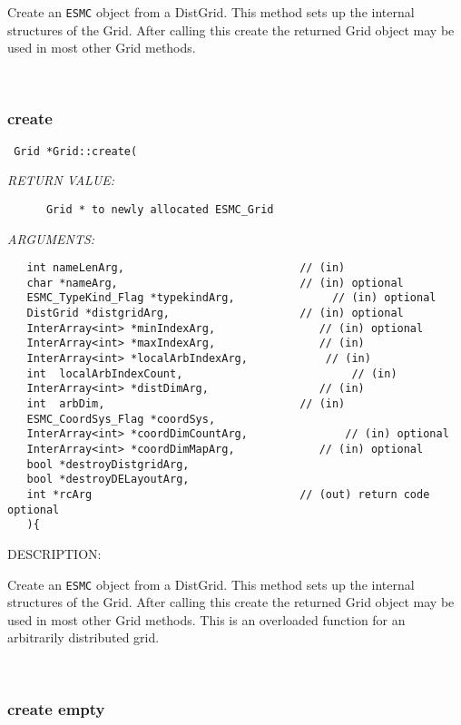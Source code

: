       Create an {\tt ESMC\gridArg} object from a DistGrid. This method sets up
    the internal structures of the Grid. After calling this create the 
    returned Grid object may be used in most other Grid methods.  
 
\mbox{}\hrulefill\ 
 
\subsubsection [create] {create}


  
\begin{verbatim} Grid *Grid::create(\end{verbatim}{\em RETURN VALUE:}
\begin{verbatim}      Grid * to newly allocated ESMC_Grid \end{verbatim}{\em ARGUMENTS:}
\begin{verbatim}   int nameLenArg,                           // (in) 
   char *nameArg,                            // (in) optional
   ESMC_TypeKind_Flag *typekindArg,               // (in) optional
   DistGrid *distgridArg,                    // (in) optional
   InterArray<int> *minIndexArg,                // (in) optional
   InterArray<int> *maxIndexArg,                // (in)
   InterArray<int> *localArbIndexArg,            // (in)
   int  localArbIndexCount,                          // (in)
   InterArray<int> *distDimArg,                 // (in) 
   int  arbDim,                              // (in)
   ESMC_CoordSys_Flag *coordSys, 
   InterArray<int> *coordDimCountArg,               // (in) optional
   InterArray<int> *coordDimMapArg,             // (in) optional
   bool *destroyDistgridArg,
   bool *destroyDELayoutArg,
   int *rcArg                                // (out) return code optional
   ){\end{verbatim}
{\sf DESCRIPTION:\\ }


      Create an {\tt ESMC\gridArg} object from a DistGrid. This method sets up
    the internal structures of the Grid. After calling this create the 
    returned Grid object may be used in most other Grid methods.  This is an
    overloaded function for an arbitrarily distributed grid.  
 
\mbox{}\hrulefill\ 
 
\subsubsection [create] {create empty}


